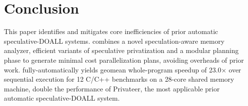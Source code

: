 \section{Conclusion}

This paper identifies and mitigates core inefficiencies of prior
automatic speculative-DOALL systems. \name combines a novel
speculation-aware memory analyzer, efficient variants of speculative
privatization and a modular planning phase to generate minimal cost
parallelization plans, avoiding overheads of prior work.
%
\name fully-automatically yields geomean whole-program speedup of
23.0$\times$ over sequential execution for 12 C/C++ benchmarks on a 28-core
shared memory machine, double the performance of Privateer, the most
applicable prior automatic speculative-DOALL system.

